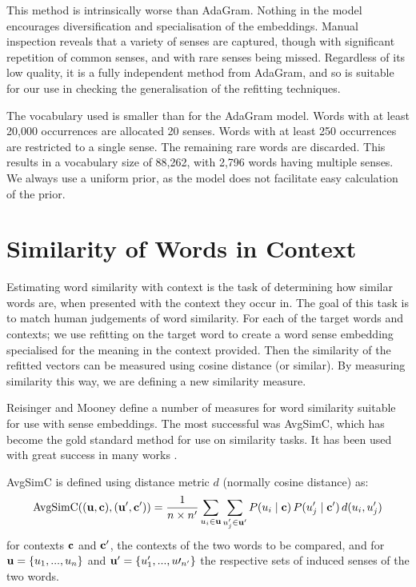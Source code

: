 {This method is intrinsically worse than AdaGram.
Nothing in the model encourages diversification and specialisation of the embeddings.
Manual inspection reveals that a variety of senses are captured, though with significant repetition of common senses, and with rare senses being missed.
Regardless of its low quality, it is a fully independent method from AdaGram, and so is suitable for our use in checking the generalisation of the refitting techniques.

The vocabulary used is smaller than for the AdaGram model.
Words with at least 20,000 occurrences are allocated 20 senses.
Words with at least 250 occurrences are restricted to a single sense.
The remaining rare words are discarded. 
This results in a vocabulary size of 88,262, with 2,796 words having multiple senses.
We always use a uniform prior, as the model does not facilitate easy calculation of the prior.



\section{Similarity of Words in Context} \label{SimilarityInContext}
Estimating word similarity with context is the task of determining how similar words are, when presented with the context they occur in.
The goal of this task is to match human judgements of word similarity.
For each of the target words and contexts; we use refitting on the target word to create a word sense embedding specialised for the meaning in the context provided.
Then the similarity of the refitted vectors can be measured using cosine distance (or similar).
By measuring similarity this way, we are defining a new similarity measure.

Reisinger and Mooney \parencite{Reisinger2010} define a number of measures for word similarity suitable for use with sense embeddings.
The most successful was AvgSimC, which has become the gold standard method for use on similarity tasks. It has been used with great success in many works \cite{Huang2012,Chen2014,tian2014probabilistic}. 


AvgSimC is defined using distance metric $d$ (normally cosine distance) as: 
\begin{equation} \label{eq:avgsimc}
\mathrm{AvgSimC}((\mathbf{u},\mathbf{c}),(\mathbf{u}^{\prime},\mathbf{c}^{\prime})) 
=  \frac{1}{n \times n^{\prime}}
\sum_{u_{i}\in\mathbf{u}}
\sum_{u_{j}^{\prime}\in\mathbf{u}^{\prime}}
P(u_{i}\mid\mathbf{c})\,P(u_{j}^{\prime}\mid\mathbf{c}^{\prime})\,d(u_{i},u_{j}^{\prime})
\end{equation}
for contexts $\mathbf{c}$ and $\mathbf{c}^\prime$, the contexts of the two words to be compared, and for $\mathbf{u}=\{u_1,...,u_n\}$ and $\mathbf{u}^\prime=\{u^\prime_1,...,u\prime_{n^\prime}\}$ the respective sets of induced senses of the two words.


}
